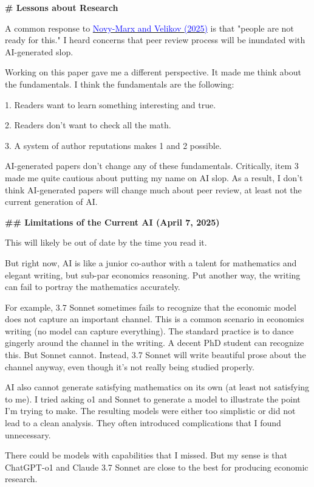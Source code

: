 \begin{mdframed}[linewidth=1pt, linecolor=black]
\textbf{\textcolor{red!70!black}{\# Lessons about Research }}

A common response to \href{https://www.nber.org/papers/w33363}{\textcolor{blue}{Novy-Marx and Velikov (2025)}} is that "people are not ready for this." I heard concerns that peer review process will be inundated with AI-generated slop.

Working on this paper gave me a different perspective. It made me think about the fundamentals. I think the fundamentals are the following:

1. Readers want to learn something interesting and true.

2. Readers don't want to check all the math.

3. A system of author reputations makes 1 and 2 possible.

AI-generated papers don't change any of these fundamentals.  Critically, item 3 made me quite cautious about putting my name on AI slop. As a result, I don't think AI-generated papers will change much about peer review, at least not the current generation of AI.

\textbf{\textcolor{red!70!black}{\#\# Limitations of the Current AI (April 7, 2025)}}

This will likely be out of date by the time you read it.

But right now, AI is like a junior co-author with a talent for mathematics and elegant writing, but sub-par economics reasoning. Put another way, the writing can fail to portray the mathematics accurately.

For example, 3.7 Sonnet sometimes fails to recognize that the economic model does not capture an important channel. This is a common scenario in economics writing (no model can capture everything). The standard practice is to dance gingerly around the channel in the writing. A decent PhD student can recognize this. But Sonnet cannot. Instead, 3.7 Sonnet will write beautiful prose about the channel anyway, even though it's not really being studied properly. 

AI also cannot generate satisfying mathematics on its own (at least not satisfying to me). I tried asking o1 and Sonnet to generate a model to illustrate the point I'm trying to make. The resulting models were either too simplistic or did not lead to a clean analysis. They often introduced complications that I found unnecessary. 

There could be models with capabilities that I missed. But my sense is that ChatGPT-o1 and Claude 3.7 Sonnet are close to the best for producing economic research.


\end{mdframed}

